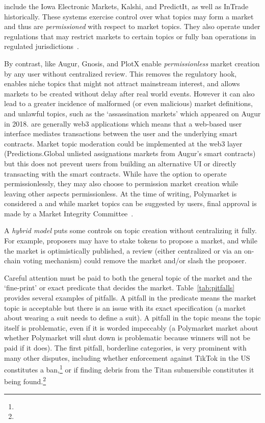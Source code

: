 \cepms include the Iowa Electronic Markets, Kalshi, and PredictIt, as well as InTrade historically. These systems exercise control over what topics may form a market and thus are \textit{permissioned} with respect to market topics. They also operate under regulations that may restrict markets to certain topics or fully ban operations in regulated jurisdictions~\cite{Du19}. 

By contrast, \depms like Augur, Gnosis, and PlotX enable \textit{permissionless} market creation by any user without centralized review. This removes the regulatory hook, enables niche topics that might not attract mainstream interest, and allows markets to be created without delay after real world events. However it can also lead to a greater incidence of malformed (or even malicious) market definitions, and unlawful topics, such as the `assassination markets' which appeared on Augur in 2018. \depms are generally web3 applications which means that a web-based user interface mediates transactions between the user and the underlying smart contracts. Market topic moderation could be implemented at the web3 layer (\eg Predictions.Global unlisted assignations markets from Augur's smart contracts) but this does not prevent users from building an alternative UI or directly transacting with the smart contracts. While \depms have the option to operate permissionlessly, they may also choose to permission market creation while leaving other aspects permissionless. At the time of writing, Polymarket is considered a \depm and while market topics can be suggested by users, final approval is made by a Market Integrity Committee~\cite{ClEsGS21}.

A \textit{hybrid model} puts some controls on topic creation without centralizing it fully. For example, proposers may have to stake tokens to propose a market, and while the market is optimistically published, a review (either centralized or via an on-chain voting mechanism) could remove the market and/or slash the proposer.  




Careful attention must be paid to both the general topic of the market and the `fine-print' or exact predicate that decides the market. Table~\ref{tab:pitfalls} provides several examples of pitfalls. A pitfall in the predicate means the market topic is acceptable but there is an issue with its exact specification (\eg a market about wearing a suit needs to define a suit). A pitfall in the topic means the topic itself is problematic, even if it is worded impeccably (\eg a Polymarket market about whether Polymarket will shut down is problematic because winners will not be paid if it does). The first pitfall, borderline categories, is very prominent with many other disputes, including whether enforcement against TikTok in the US constitutes a ban,\footnote{} or if finding debris from the Titan submersible constitutes it being found.\footnote{} 

